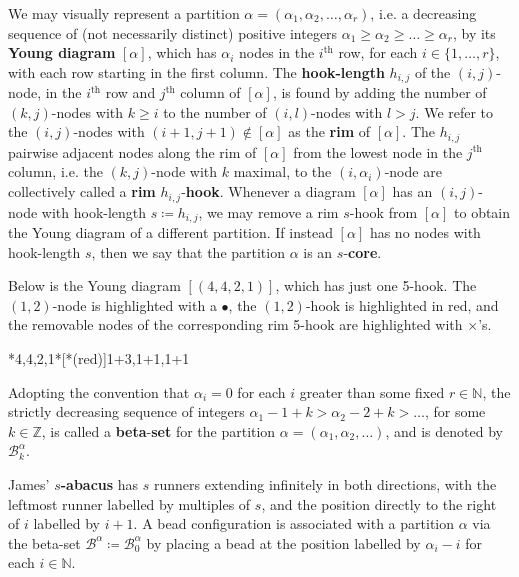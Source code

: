 \documentclass[ALCO, Unicode,published]{cedram}
\begin{document}
We may visually represent a partition $\alpha=(\alpha_1,\alpha_2,\dots,\alpha_r)$, i.e. a decreasing sequence of (not necessarily distinct) positive integers $\alpha_1\geq\alpha_2\geq\dots\geq\alpha_r$, by its \textbf{Young diagram} $[\alpha]$, which has $\alpha_i$  nodes in the $i^\text{th}$ row, for each $i\in\{1,\dots,r\}$, with each row starting in the first column. The \textbf{hook-length} $h_{i,j}$ of the $(i,j)$-node, in the $i^\text{th}$ row and $j^\text{th}$ column of $[\alpha]$, is found by adding the number of $(k,j)$-nodes with $k\geq i$ to the number of $(i,l)$-nodes with $l>j$. We refer to the $(i,j)$-nodes with $(i+1,j+1)\not\in[\alpha]$ as the \textbf{rim} of $[\alpha]$. 
The $h_{i,j}$ pairwise adjacent nodes along the rim of $[\alpha]$ from the lowest node in the $j^\text{th}$ column, i.e. the $(k,j)$-node with $k$ maximal, to the $(i,\alpha_i)$-node are collectively called a \textbf{rim} $h_{i,j}$-\textbf{hook}. Whenever a diagram $[\alpha]$ has an $(i,j)$-node with hook-length $s\coloneqq h_{i,j}$, we may remove a rim $s$-hook from $[\alpha]$ to obtain the Young diagram of a different partition. If instead $[\alpha]$ has no nodes with hook-length $s$, then we say that the partition $\alpha$ is an $s$-\textbf{core}. 

\begin{exam}\label{ex3}
Below is the Young diagram $[(4,4,2,1)]$, which has just one 5-hook. The $(1,2)$-node is highlighted with a $\bullet$, the $(1,2)$-hook is highlighted in red, and the removable nodes of the corresponding rim 5-hook are highlighted with $\times$'s.

\begin{center}
\ytableaushort{\none \bullet \none \times,\none \times \times \times, \none \times}*{4,4,2,1}*[*(red)]{1+3,1+1,1+1}
\end{center}
\end{exam}

Adopting the convention that $\alpha_i=0$ for each $i$ greater than some fixed $r\in\mathbb{N}$, the strictly decreasing sequence of integers $\alpha_1-1+k>\alpha_2-2+k>\dots$, for some $k\in\mathbb{Z}$, is called a \textbf{beta}-\textbf{set} for the partition $\alpha=(\alpha_1,\alpha_2,\dots)$, and is denoted by $\mathcal{B}^\alpha_k$. 


James' $s$\textbf{-abacus} has $s$ runners extending infinitely in both directions, with the leftmost runner labelled by multiples of $s$, and the position directly to the right of $i$ labelled by $i+1$. A bead configuration is associated with a partition $\alpha$ via the beta-set $\mathcal{B}^\alpha\coloneqq\mathcal{B}^\alpha_0$ by placing a bead at the position labelled by $\alpha_i-i$ for each $i\in\mathbb{N}$. 
\end{document}
